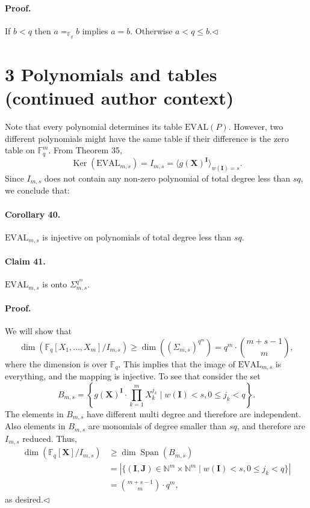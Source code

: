 \documentclass[10pt,a4paper]{article}
\begin{document}
\paragraph{Proof.} If $b<q$ then $a=_{\mathbb F_q}b$ implies $a=b$. Otherwise $a<q\leq b$.\hfill$\triangleleft$
\section*{3 Polynomials and tables (continued author context)}
Note that every polynomial determines its table $\mathrm{EVAL}(P)$. However, two different polynomials might have the same table if their difference is the zero table on $\mathbb F_q^m$. From Theorem 35,
\[\operatorname{Ker}(\mathrm{EVAL}_{m,s})=I_{m,s}=\langle g(\boldsymbol X)^{\boldsymbol I}\rangle_{w(\boldsymbol I)=s}.\]
Since $I_{m,s}$ does not contain any non-zero polynomial of total degree less than $sq$, we conclude that:
\paragraph{Corollary 40.} $\mathrm{EVAL}_{m,s}$ is injective on polynomials of total degree less than $sq$.
\paragraph{Claim 41.} $\mathrm{EVAL}_{m,s}$ is onto $\Sigma_{m,s}^{q^m}$.
\paragraph{Proof.} We will show that
\[\dim(\mathbb F_q[X_1,\ldots,X_m]/I_{m,s})\geq\dim((\Sigma_{m,s})^{q^m})=q^m\cdot\binom{m+s-1}{m},\]
where the dimension is over $\mathbb F_q$. This implies that the image of $\mathrm{EVAL}_{m,s}$ is everything, and the mapping is injective.
To see that consider the set
\[B_{m,s}=\left\{g(\boldsymbol X)^{\boldsymbol I}\cdot\prod_{k=1}^mX_k^{j_k}\mid w(\boldsymbol I)<s,0\leq j_k<q\right\}.\tag{5}\]
The elements in $B_{m,s}$ have different multi degree and therefore are independent. Also elements in $B_{m,s}$ are monomials of degree smaller than $sq$, and therefore are $I_{m,s}$ reduced. Thus,
\begin{align*}
\dim(\mathbb F_q[\boldsymbol X]/I_{m,s})&\geq\dim\operatorname{Span}(B_{m,s})\\
&=|\{(\boldsymbol I,\boldsymbol J)\in\mathbb N^m\times\mathbb N^m\mid w(\boldsymbol I)<s,0\leq j_k<q\}|\\
&=\binom{m+s-1}m\cdot q^m,
\end{align*}
as desired.\hfill$\triangleleft$
\end{document}
